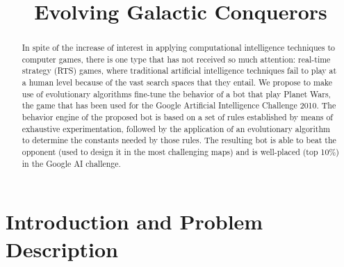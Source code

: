 \documentclass{llncs}
\begin{document}

\title{Evolving Galactic Conquerors}




%

\maketitle

%
%
\begin{abstract}
In spite of the increase of interest in applying computational
intelligence techniques to computer games, there is one type that has
not received so much attention: real-time strategy (RTS) games, where traditional artificial intelligence techniques fail to play at a human level because of the vast search spaces that they entail.
We propose to make use of evolutionary algorithms fine-tune the
behavior of a bot that play Planet Wars, the game that has been used
for the Google Artificial Intelligence Challenge 2010.
The behavior engine of the proposed bot is based on a set of rules
established by means of exhaustive experimentation, followed by the
application of an evolutionary algorithm to determine the constants needed by those
rules. The resulting bot is able to beat the opponent (used to design it in the most challenging maps) and is well-placed (top 10\%) in the Google AI
challenge. 


\end{abstract}

%
%
\section{Introduction and Problem Description}
\label{sec:intro}
%
\end{document}
